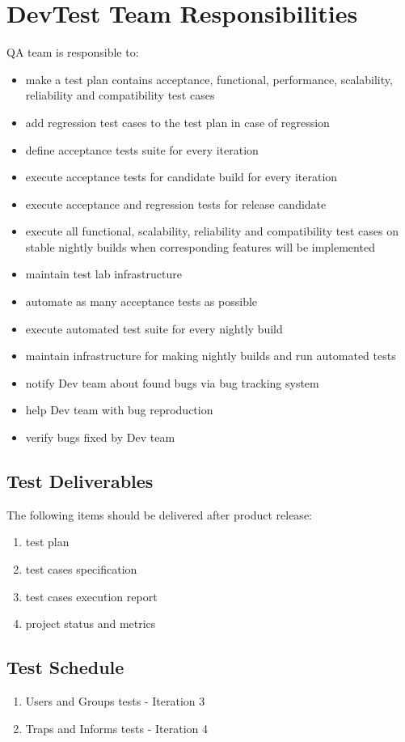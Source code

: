 \documentclass[a4paper,11pt]{article}
\begin{document}
\section{DevTest Team Responsibilities}
QA team is responsible to:
\begin{itemize}
\item make a test plan contains acceptance, functional, performance, scalability, reliability and compatibility test cases
\item add regression test cases to the test plan in case of regression
\item define acceptance tests suite for every iteration
\item execute acceptance tests for candidate build for every iteration
\item execute acceptance and regression tests for release candidate
\item execute all functional, scalability, reliability and compatibility test cases on stable nightly builds when corresponding features will be implemented
\item maintain test lab infrastructure
\item automate as many acceptance tests as possible
\item execute automated test suite for every nightly build
\item maintain infrastructure for making nightly builds and run automated tests
\item notify Dev team about found bugs via bug tracking system
\item help Dev team with bug reproduction
\item verify bugs fixed by Dev team
\end{itemize}

\subsection{Test Deliverables}
The following items should be delivered after product release:
\begin{enumerate}
\item test plan
\item test cases specification
\item test cases execution report
\item project status and metrics
\end{enumerate}


\subsection{Test Schedule}
\begin{enumerate}
\item Users and Groups tests - Iteration 3
\item Traps and Informs tests - Iteration 4
\end{enumerate}
\end{document}
